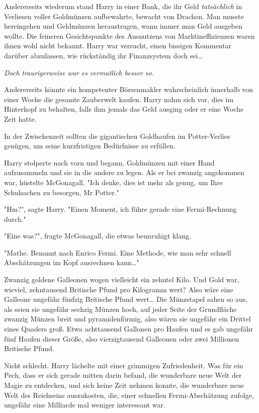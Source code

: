 {Andererseits wiederum stand Harry in einer Bank, die ihr Geld \emph{tatsächlich} in Verliesen voller Goldmünzen aufbewahrte, bewacht von Drachen. Man musste hereingehen und Geldmünzen heraustragen, wann immer man Geld ausgeben wollte. Die feineren Gesichtspunkte des Ausnutzens von Marktineffizienzen waren ihnen wohl nicht bekannt. Harry war versucht, einen bissigen Kommentar darüber abzulassen, wie rückständig ihr Finanzsystem doch sei…

\emph{Doch traurigerweise war es vermutlich besser so.}

Andererseits könnte ein kompetenter Börsenmakler wahrscheinlich innerhalb von einer Woche die gesamte Zauberwelt kaufen. Harry nahm sich vor, dies im Hinterkopf zu behalten, falls ihm jemals das Geld ausging oder er eine Woche Zeit hatte.

In der Zwischenzeit sollten die gigantischen Goldhaufen im Potter-Verlies genügen, um seine kurzfristigen Bedürfnisse zu erfüllen.

Harry stolperte nach vorn und begann, Goldmünzen mit einer Hand aufzusammeln und sie in die andere zu legen. Als er bei zwanzig angekommen war, hüstelte McGonagall. "Ich denke, dies ist mehr als genug, um Ihre Schulsachen zu besorgen, Mr Potter."

"Hm?", sagte Harry. "Einen Moment, ich führe gerade eine Fermi-Rechnung durch."

"Eine was?", fragte McGonagall, die etwas beunruhigt klang.

"Mathe. Benannt nach Enrico Fermi. Eine Methode, wie man sehr schnell Abschätzungen im Kopf ausrechnen kann…"

Zwanzig goldene Galleonen wogen vielleicht ein zehntel Kilo. Und Gold war, wieviel, zehntausend Britische Pfund pro Kilogramm wert? Also wäre eine Galleone ungefähr fünfzig Britische Pfund wert… Die Münzstapel sahen so aus, als seien sie ungefähr sechzig Münzen hoch, auf jeder Seite der Grundfläche zwanzig Münzen breit und pyramidenförmig, also wären sie ungefähr ein Drittel eines Quaders groß. Etwa achttausend Gallonen pro Haufen und es gab ungefähr fünf Haufen dieser Größe, also vierzigtausend Galleonen oder zwei Millionen Britische Pfund.

Nicht schlecht. Harry lächelte mit einer grimmigen Zufriedenheit. Was für ein Pech, dass er sich gerade mitten darin befand, die wunderbare neue Welt der Magie zu entdecken, und sich keine Zeit nehmen konnte, die wunderbare neue Welt des Reichseins auszukosten, die, einer schnellen Fermi-Abschätzung zufolge, ungefähr eine Milliarde mal weniger interessant war.

}
